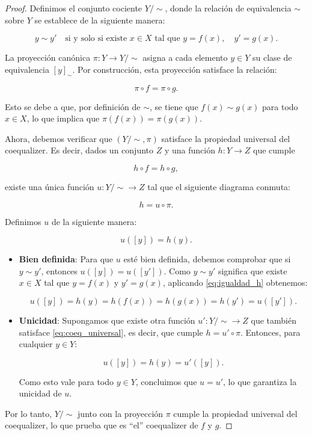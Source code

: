 \begin{proof}
    Definimos el conjunto cociente $Y / \sim$, donde la relación de equivalencia $\sim$ sobre $Y$ se establece de la siguiente manera:

    $$
        y \sim y' \quad \text{si y solo si existe } x \in X \text{ tal que } y = f(x), \quad y' = g(x).
    $$

    La proyección canónica $\pi: Y \to Y / \sim$ asigna a cada elemento $y \in Y$ su clase de equivalencia $[y]_{\sim}$. Por construcción, esta proyección satisface la relación:

    $$
        \pi \circ f = \pi \circ g.
    $$

    Esto se debe a que, por definición de $\sim$, se tiene que $f(x) \sim g(x)$ para todo $x \in X$, lo que implica que $\pi(f(x)) = \pi(g(x))$. 

    Ahora, debemos verificar que $(Y / \sim, \pi)$ satisface la propiedad universal del coequalizer. Es decir, dados un conjunto $Z$ y una función $h: Y \to Z$ que cumple 

    \begin{equation} \label{eq:igualdad_h}
        h \circ f = h \circ g,
    \end{equation}

    existe una única función $u: Y / \sim \to Z$ tal que el siguiente diagrama conmuta:

    \begin{equation} \label{eq:coeq_universal}
        h = u \circ \pi.
    \end{equation}

    Definimos $u$ de la siguiente manera:

    $$
        u([y]) = h(y).
    $$

    \begin{itemize}
        \item  \textbf{Bien definida}: Para que $u$ esté bien definida, debemos comprobar que si $y \sim y'$, entonces $u([y]) = u([y'])$. Como $y \sim y'$ significa que existe $x \in X$ tal que $y = f(x)$ y $y' = g(x)$, aplicando \eqref{eq:igualdad_h} obtenemos:

        $$
            u([y]) = h(y) = h(f(x)) = h(g(x)) = h(y') = u([y']).
        $$

        \item  \textbf{Unicidad}: Supongamos que existe otra función $u': Y / \sim \to Z$ que también satisface \eqref{eq:coeq_universal}, es decir, que cumple $h = u' \circ \pi$. Entonces, para cualquier $y \in Y$:

        $$
            u([y]) = h(y) = u'([y]).
        $$
    
        Como esto vale para todo $y \in Y$, concluimos que $u = u'$, lo que garantiza la unicidad de $u$.
    \end{itemize}

    Por lo tanto, $Y / \sim$ junto con la proyección $\pi$ cumple la propiedad universal del coequalizer, lo que prueba que es ``el'' coequalizer de $f$ y $g$.
\end{proof}

